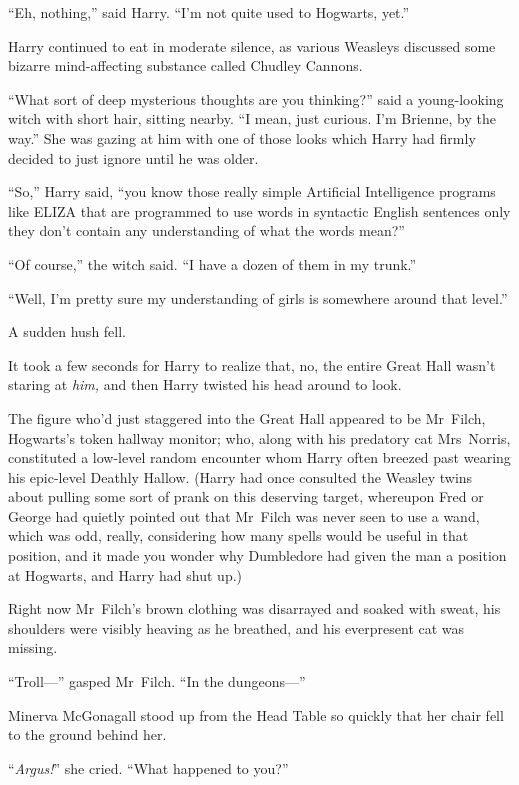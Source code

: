 “Eh, nothing,” said Harry. “I’m not quite used to Hogwarts, yet.”

Harry continued to eat in moderate silence, as various Weasleys discussed some
bizarre mind-affecting substance called Chudley Cannons.

“What sort of deep mysterious thoughts are you thinking?” said a young-looking
witch with short hair, sitting nearby. “I mean, just curious. I’m Brienne, by
the way.” She was gazing at him with one of those looks which Harry had firmly
decided to just ignore until he was older.

“So,” Harry said, “you know those really simple Artificial Intelligence
programs like ELIZA that are programmed to use words in syntactic English
sentences only they don’t contain any understanding of what the words mean?”

“Of course,” the witch said. “I have a dozen of them in my trunk.”

“Well, I’m pretty sure my understanding of girls is somewhere around that
level.”

A sudden hush fell.

It took a few seconds for Harry to realize that, no, the entire Great Hall
wasn’t staring at \emph{him,} and then Harry twisted his head around to look.

The figure who’d just staggered into the Great Hall appeared to be Mr~Filch,
Hogwarts’s token hallway monitor; who, along with his predatory cat
Mrs~Norris, constituted a low-level random encounter whom Harry often breezed
past wearing his epic-level Deathly Hallow. (Harry had once consulted the
Weasley twins about pulling some sort of prank on this deserving target,
whereupon Fred or George had quietly pointed out that Mr~Filch was never seen
to use a wand, which was odd, really, considering how many spells would be
useful in that position, and it made you wonder why Dumbledore had given the
man a position at Hogwarts, and Harry had shut up.)

Right now Mr~Filch’s brown clothing was disarrayed and soaked with sweat, his
shoulders were visibly heaving as he breathed, and his everpresent cat was
missing.

“Troll—” gasped Mr~Filch. “In the dungeons—”

\later

Minerva McGonagall stood up from the Head Table so quickly that her chair fell
to the ground behind her.

“\emph{Argus!}” she cried. “What happened to you?”

